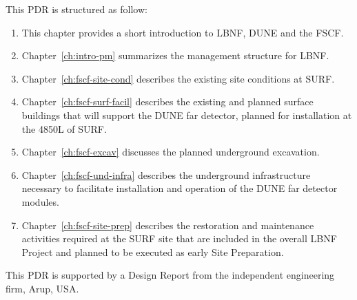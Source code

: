 This PDR is structured as follow:
\begin{enumerate}
\item This chapter provides a short introduction to LBNF, DUNE and the FSCF.
\item Chapter~\ref{ch:intro-pm} summarizes the management structure for LBNF.
\item Chapter~\ref{ch:fscf-site-cond} describes the existing site conditions at SURF. 
\item Chapter~\ref{ch:fscf-surf-facil} describes the existing and planned surface buildings that will support the DUNE far detector, planned for installation at the 4850L of SURF.
\item Chapter~\ref{ch:fscf-excav} discusses the planned underground excavation. 
\item Chapter~\ref{ch:fscf-und-infra} describes the underground infrastructure necessary to facilitate installation and operation of the DUNE far detector modules.
\item Chapter~\ref{ch:fscf-site-prep} describes the restoration and maintenance activities required at the SURF site that
are included in the overall LBNF Project and planned to be executed as early Site Preparation.
\end{enumerate}

This PDR is supported by a Design Report from the independent engineering firm, Arup, USA\cite{arup:fscf100pdr}.


